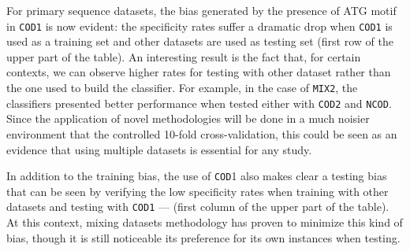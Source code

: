 \documentclass{sig-alternate}
\theoremstyle{plain}
\begin{document}
For primary sequence datasets, the bias generated by the presence of ATG motif in {\tt COD1} is now evident:  the specificity rates suffer a dramatic drop when {\tt COD1} is used as a training set and other datasets are used as testing set (first row of the upper part of the table). An interesting result is the fact that, for certain contexts, we can observe higher rates for testing with other dataset rather than the one used to build the classifier. For example, in the case of {\tt MIX2}, the classifiers presented better performance when tested either with {\tt COD2} and {\tt NCOD}. Since the application of novel methodologies will be done in a much noisier environment that the controlled 10-fold cross-validation, this could be seen as an evidence  that using multiple datasets is essential for any study.

In addition to the training bias, the use  of {\tt COD}1 also makes clear a testing bias that can be seen by verifying the low specificity rates when training with other datasets and testing with {\tt COD1} --- (first column of the upper part of the table). At this context, mixing datasets methodology has proven to minimize  this kind of bias, though  it is still noticeable its preference for its own instances when testing.
\end{document}
